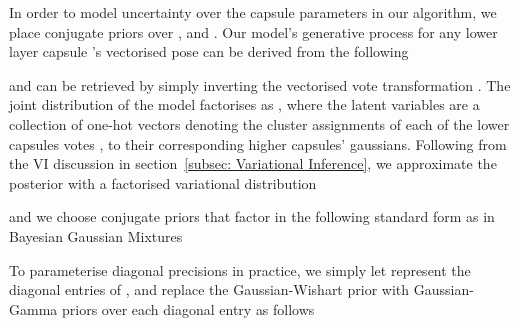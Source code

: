 \documentclass[letterpaper]{article} \usepackage{aaai20}  \usepackage{times}  \usepackage{helvet} \usepackage{courier}  \usepackage[hyphens]{url}  \usepackage{graphicx} \urlstyle{rm} \def\UrlFont{\rm}  \usepackage{graphicx}  \frenchspacing  \setlength{\pdfpagewidth}{8.5in}  \setlength{\pdfpageheight}{11in}  \nocopyright
\begin{document}
In order to model uncertainty over the capsule parameters in our algorithm, we place conjugate priors over ,  and . Our model's generative process for any lower layer capsule 's vectorised pose  can be derived from the following

and  can be retrieved by simply inverting the vectorised vote transformation . The joint distribution of the model factorises as , where the latent variables  are a collection of  one-hot vectors denoting the cluster assignments of each of the lower capsules votes , to their corresponding higher capsules' gaussians. 
Following from the VI discussion in section~\ref{subsec: Variational Inference}, we approximate the posterior  with a factorised variational distribution

and we choose conjugate priors that factor in the following standard form as in Bayesian Gaussian Mixtures

To parameterise diagonal precisions in practice, we simply let  represent the diagonal entries of , and replace the Gaussian-Wishart prior with Gaussian-Gamma priors over each diagonal entry  as follows
\end{document}

